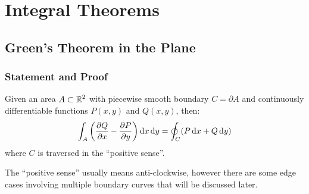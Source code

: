 \documentclass[../main.tex]{subfiles}
\begin{document}
\chapter{Integral Theorems}
\section{Green's Theorem in the Plane}
\subsection{Statement and Proof}
\begin{theorem}
  Given an area $A \subset \mathbb{R}^2$ with piecewise smooth boundary $C = \partial A$ and continuously differentiable functions $P(x, y)$ and $Q(x, y)$, then:
  \label{greensTheorem}
  \[
    \int_{A} \left(\pderiv{Q}{x} - \pderiv{P}{y}\right) \d{x} \d{y} = \oint_{C} (P \d{x} + Q \d{y})
  \]
  where $C$ is traversed in the ``positive sense''.

  The ``positive sense'' usually means anti-clockwise, however there are some edge cases involving multiple boundary curves that will be discussed later.
\end{theorem}
\end{document}
